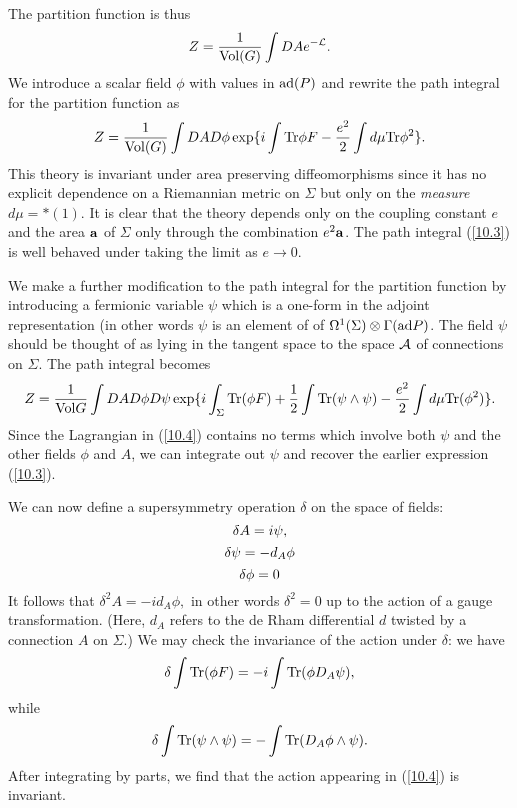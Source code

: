 \documentclass[12pt]{article}
\begin{document}
The partition function is thus
\begin{equation} \labell{10.2}
 Z = \frac{1}{ {\rm Vol}  (G)} \int D A e^{ - {\cal L} }.
\end{equation}
We introduce a scalar field $\phi$ with values in ${\rm ad}(P)$ 
and rewrite the path integral for the partition function as 
\begin{equation} \labell{10.3}
 Z = \frac{1}{\voll (G)} \int DA D \phi \exp \{
i \int \Tr \phi F - \frac{e^2}{2} \int d\mu \Tr \phi^2 
\}. 
\end{equation}
This theory is invariant under area preserving diffeomorphisms since it
has no explicit dependence on a Riemannian metric on $\Sigma $ but
only on the {\it{measure}}
   $d\mu = * (1)$. 
It is clear that the theory depends only on
the coupling constant $e$ and  
   the area ${\bf a}$ of $\Sigma$ only 
through the combination  $e^2 {\bf a}$.
The path integral  (\ref{10.3}) is well behaved
under taking  the limit as 
$e \to 0$.

We make a further modification to the path integral for the partition 
function by introducing a fermionic variable $\psi$ which is a one-form
in the adjoint representation (in other words $\psi$ is an element of
of $\Omega^1(\Sigma)  \otimes \Gamma({\rm ad} P)$. The field $\psi$ should
be thought of as lying in the tangent space to the space $\cal A$ of 
connections on $\Sigma$. 
The path integral becomes
\begin{equation} \labell{10.4}
Z = \frac{1}{\voll G} \int DA D\phi D \psi \exp \{ i \int_\Sigma 
\Tr (\phi F) + \frac{1}{2} \int \Tr (\psi \wedge \psi) 
- \frac{e^2}{2} \int d\mu \Tr (\phi^2) \}.  
\end{equation}
Since the Lagrangian in (\ref{10.4}) contains no terms which involve both 
$\psi $ and the other fields $\phi$ and $A$, we can integrate out
$\psi$ and recover the earlier expression (\ref{10.3}).

We can now define a supersymmetry operation 
$\delta$ on the space of fields:
\begin{equation} \labell{10.5}
 \delta A = i \psi, 
\end{equation}
\begin{equation} \labell{10.6}
 \delta \psi = - d_A \phi 
\end{equation}
\begin{equation} \labell{10.7}
 \delta \phi = 0 
\end{equation}
It follows that 
$\delta^2 A = - i d_A \phi, $ in other words $\delta^2 = 0 $ up to the
action of a gauge transformation.
(Here, $d_A$ refers to the de Rham differential $d$ twisted by a 
connection $A$ on $\Sigma$.) 
We may check the invariance of the action under $\delta$: we have
\begin{equation} \labell{10.8}
 \delta \int \Tr (\phi F) = - i  \int \Tr (\phi D_A \psi), 
\end{equation}
while 
\begin{equation} \labell{10.9}
 \delta \int \Tr (\psi \wedge \psi) = - \int \Tr (D_A \phi  \wedge \psi).
\end{equation}
After integrating by parts, we find that the action appearing in 
(\ref{10.4}) is invariant.
\end{document}
